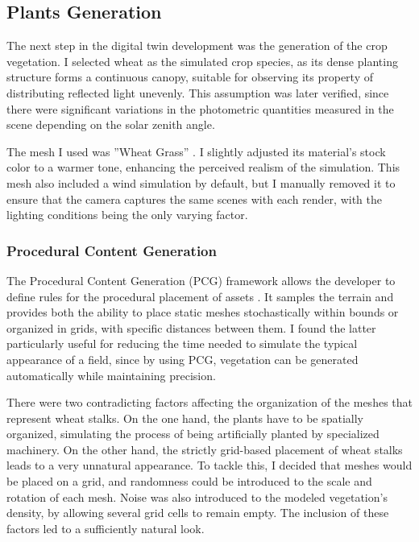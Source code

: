 \subsection{Plants Generation}
The next step in the digital twin development was the generation of the crop vegetation. I selected wheat as the simulated crop species, as its dense planting structure forms a continuous canopy, suitable for observing its property of distributing reflected light unevenly. This assumption was later verified, since there were significant variations in the photometric quantities measured in the scene depending on the solar zenith angle.

The mesh I used was ”Wheat Grass” \cite{quixel_wheat_grass_fab}. I slightly adjusted its material's stock color to a warmer tone, enhancing the perceived realism of the simulation. This mesh also included a wind simulation by default, but I manually removed it to ensure that the camera captures the same scenes with each render, with the lighting conditions being the only varying factor.

\subsubsection{Procedural Content Generation}

The Procedural Content Generation (PCG) framework allows the developer to define rules for the procedural placement of assets \cite{epic_pcg_overview}. It samples the terrain and provides both the ability to place static meshes stochastically within bounds or organized in grids, with specific distances between them. I found the latter particularly useful for reducing the time needed to simulate the typical appearance of a field, since by using PCG, vegetation can be generated automatically while maintaining precision.

There were two contradicting factors affecting the organization of the meshes that represent wheat stalks. On the one hand, the plants have to be spatially organized, simulating the process of being artificially planted by specialized machinery. On the other hand, the strictly grid-based placement of wheat stalks leads to a very unnatural appearance. To tackle this, I decided that meshes would be placed on a grid, and randomness could be introduced to the scale and rotation of each mesh. Noise was also introduced to the modeled vegetation’s density, by allowing several grid cells to remain empty. The inclusion of these factors led to a sufficiently natural look.

